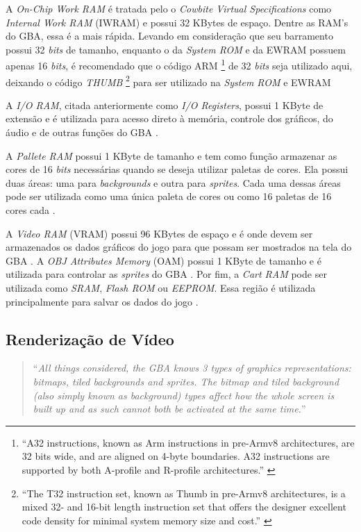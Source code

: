 A \textit{On-Chip Work RAM} é tratada pelo o \textit{Cowbite Virtual Specifications} como \textit{Internal Work RAM} (IWRAM) e possui 32 KBytes de espaço. Dentre as RAM's do GBA, essa é a mais rápida. Levando em consideração que seu barramento possui 32 \textit{bits} de tamanho, enquanto o da \textit{System ROM} e da EWRAM possuem apenas 16 \textit{bits}, é recomendado que o código ARM \footnote{``A32 instructions, known as Arm instructions in pre-Armv8 architectures, are 32 bits wide, and are aligned on 4-byte boundaries. A32 instructions are supported by both A-profile and R-profile architectures.'' \cite{arm}} de 32 \textit{bits} seja utilizado aqui, deixando o código \textit{THUMB} \footnote{``The T32 instruction set, known as Thumb in pre-Armv8 architectures, is a mixed 32- and 16-bit length instruction set that offers the designer excellent code density for minimal system memory size and cost.'' \cite{arm}} para ser utilizado na \textit{System ROM} e EWRAM \cite{cowbite}

A \textit{I/O RAM}, citada anteriormente como \textit{I/O Registers}, possui 1 KByte de extensão e é utilizada para acesso direto à memória, controle dos gráficos, do áudio e de outras funções do GBA \cite{cowbite}.

A \textit{Pallete RAM} possui 1 KByte de tamanho e tem como função armazenar as cores de 16 \textit{bits} necessárias quando se deseja utilizar paletas de cores. Ela possui duas áreas: uma para \textit{backgrounds} e outra para \textit{sprites}. Cada uma dessas áreas pode ser utilizada como uma única paleta de cores ou como 16 paletas de 16 cores cada \cite{cowbite}.

A \textit{Video RAM} (VRAM) possui 96 KBytes de espaço e é onde devem ser armazenados os dados gráficos do jogo para que possam ser mostrados na tela do GBA \cite{cowbite}. A \textit{OBJ Attributes Memory} (OAM) possui 1 KByte de tamanho e é utilizada para controlar as \textit{sprites} do GBA \cite{cowbite}. Por fim, a \textit{Cart RAM} pode ser utilizada como \textit{SRAM}, \textit{Flash ROM} ou \textit{EEPROM}. Essa região é utilizada principalmente para salvar os dados do jogo \cite{cowbite}.

\subsection{Renderização de Vídeo}

\begin{quote}``\textit{All things considered, the GBA knows 3 types of graphics representations: bitmaps, tiled backgrounds and sprites. The bitmap and tiled background (also simply known as background) types affect how the whole screen is built up and as such cannot both be activated at the same time.}'' \cite[p. 38]{tonc}\end{quote}

